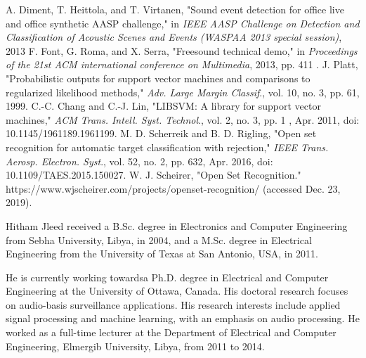 \documentclass{ieeeaccess}
\begin{document}
\begin{thebibliography}{00}
	A. Diment, T. Heittola, and T. Virtanen, "Sound event detection for office live and office synthetic AASP challenge," in\textit{ IEEE AASP Challenge on Detection and Classification of Acoustic Scenes and Events (WASPAA 2013 special session)}, 2013 
	F. Font, G. Roma, and X. Serra, "Freesound technical demo," in \textit{Proceedings of the 21st ACM international conference on Multimedia}, 2013, pp. 411 .
	J. Platt, "Probabilistic outputs for support vector machines and comparisons to regularized likelihood methods," \textit{Adv. Large Margin Classif}., vol. 10, no. 3, pp. 61, 1999.
	C.-C. Chang and C.-J. Lin, "LIBSVM: A library for support vector machines," \textit{ACM Trans. Intell. Syst. Technol}., vol. 2, no. 3, pp. 1 , Apr. 2011, doi: 10.1145/1961189.1961199.
	M. D. Scherreik and B. D. Rigling, "Open set recognition for automatic target classification with rejection," \textit{IEEE Trans. Aerosp. Electron. Syst}., vol. 52, no. 2, pp. 632, Apr. 2016, doi: 10.1109/TAES.2015.150027.
	W. J. Scheirer, "Open Set Recognition." https://www.wjscheirer.com/projects/openset-recognition/ (accessed Dec. 23, 2019).


\end{thebibliography}

\begin{IEEEbiography}{Hitham Jleed} received a B.Sc. degree in Electronics and Computer Engineering from Sebha University, Libya, in 2004, and a M.Sc. degree in Electrical Engineering from the University of Texas at San Antonio, USA, in 2011. 

He is currently working towardsa Ph.D. degree in Electrical and Computer Engineering at the University of Ottawa, Canada. His doctoral research focuses on audio-basis surveillance applications. His research interests include applied signal processing and machine learning, with an emphasis on audio processing. He worked as a full-time lecturer at the Department of Electrical and Computer Engineering, Elmergib University, Libya, from 2011 to 2014. 
\end{IEEEbiography}
\end{document}
